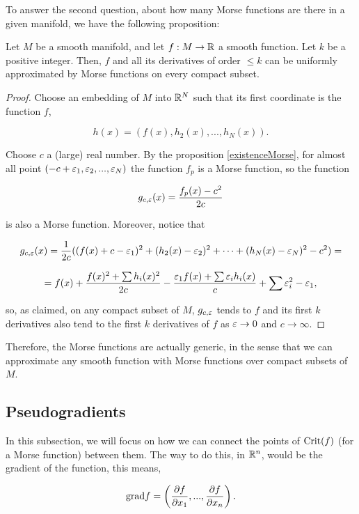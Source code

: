 To answer the second question, about how many Morse functions are there in a given manifold, we have the following proposition:

\begin{prop}
Let $M$ be a smooth manifold, and let $f : M \rightarrow \mathbb{R}$ a smooth function. Let $k$ be a positive integer. Then, $f$ and all its derivatives of order $\leq k$ can be uniformly approximated by Morse functions on every compact subset.
\end{prop}

\begin{proof}
Choose an embedding of $M$ into $\mathbb{R}^N$ such that its first coordinate is the function $f$,

\begin{displaymath}
h(x) = (f(x),h_2(x),...,h_N(x)) .
\end{displaymath}

Choose $c$ a (large) real number. By the proposition \ref{existenceMorse}, for almost all point $(-c+\varepsilon_1,\varepsilon_2,...,\varepsilon_N)$ the function $f_p$ is a Morse function, so the function

$$g_{c,\varepsilon}(x) = \frac{f_p(x)-c^2}{2c}$$

is also a Morse function. Moreover, notice that

$$g_{c,\varepsilon}(x) = \frac1{2c} ((f(x) + c - \varepsilon_1)^2 + (h_2(x)-\varepsilon_2)^2 + \cdots + (h_N(x)-\varepsilon_N)^2 - c^2) =$$

$$= f(x) + \frac{f(x)^2 + \sum h_i(x)^2}{2c} - \frac{\varepsilon_1f(x) + \sum \varepsilon_ih_i(x)}{c} + \sum \varepsilon_i^2 - \varepsilon_1 ,$$

so, as claimed, on any compact subset of $M$, $g_{c,\varepsilon}$ tends to $f$ and its first $k$ derivatives also tend to the first $k$ derivatives of $f$ as $\varepsilon \rightarrow 0$ and $c \rightarrow \infty$.
\end{proof}

Therefore, the Morse functions are actually generic, in the sense that we can approximate any smooth function with Morse functions over compact subsets of $M$.

\subsection{Pseudogradients}

In this subsection, we will focus on how we can connect the points of $\text{Crit}(f)$ (for a Morse function) between them. The way to do this, in $\mathbb{R}^n$, would be the gradient of the function, this means,

$$\text{grad} f = \left( \frac{\partial f}{\partial x_1},...,\frac{\partial f}{\partial x_n} \right) .$$


